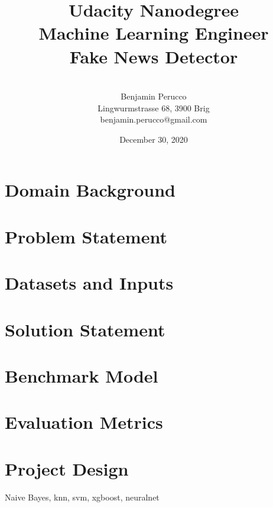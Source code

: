 \documentclass[a4paper]{article}
\begin{document}
\title{{\large Udacity Nanodegree\\Machine Learning Engineer}\\[1.5cm]Fake News Detector}
\author{\\[1.5cm]Benjamin Perucco\\Lingwurmstrasse 68, 3900 Brig\\benjamin.perucco@gmail.com}
\date{December 30, 2020} 
\maketitle
\thispagestyle{empty}

\newpage
\tableofcontents
\thispagestyle{empty}
\newpage

\section{Domain Background}

\section{Problem Statement}

\section{Datasets and Inputs}

\section{Solution Statement}

\section{Benchmark Model}

\section{Evaluation Metrics}

\section{Project Design}

Naive Bayes, knn, svm, xgboost, neuralnet
\end{document}
